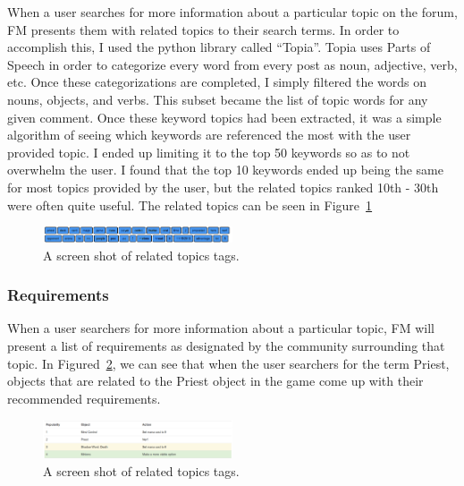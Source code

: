 \documentclass[conference]{IEEEtran}
\begin{document}
When a user searches for more information about a particular topic on the forum, FM presents them with related
topics to their search terms. In order to accomplish this, I used the python library called ``Topia''. Topia 
uses Parts of Speech in order to categorize every word from every post as noun, adjective, verb, etc. Once these
categorizations are completed, I simply filtered the words on nouns, objects, and verbs. This subset became the
list of topic words for any given comment. Once these keyword topics had been extracted, it was a simple algorithm
of seeing which keywords are referenced the most with the user provided topic. I ended up limiting it to the
top 50 keywords so as to not overwhelm the user. I found that the top 10 keywords ended up being the same for most
topics provided by the user, but the related topics ranked 10th - 30th were often quite useful. The related topics
can be seen in Figure~\ref{fig:rel}

\begin{figure}[h]
\centering
\includegraphics[width=0.5\textwidth]{images/rel.png}
\caption{A screen shot of related topics tags.\label{fig:rel}}
\end{figure}

\subsubsection{Requirements}

When a user searchers for more information about a particular topic, FM will present a list of requirements
as designated by the community surrounding that topic. In Figured~\ref{fig:req}, we can see that when
the user searchers for the term Priest, objects that are related to the Priest object in the game come up
with their recommended requirements.

\begin{figure}[h]
\centering
\includegraphics[width=0.5\textwidth]{images/req.png}
\caption{A screen shot of related topics tags.\label{fig:req}}
\end{figure}
\end{document}

